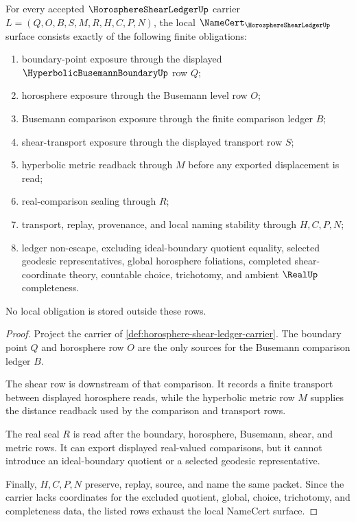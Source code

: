 \begin{theorem}
\label{thm:horosphere-shear-ledger-namecert-obligations}
For every accepted $\HorosphereShearLedgerUp$ carrier $L=(Q,O,B,S,M,R,H,C,P,N)$, the local $\NameCert_{\HorosphereShearLedgerUp}$ surface consists exactly of the following finite obligations:
\begin{enumerate}
\item boundary-point exposure through the displayed $\HyperbolicBusemannBoundaryUp$ row $Q$;
\item horosphere exposure through the Busemann level row $O$;
\item Busemann comparison exposure through the finite comparison ledger $B$;
\item shear-transport exposure through the displayed transport row $S$;
\item hyperbolic metric readback through $M$ before any exported displacement is read;
\item real-comparison sealing through $R$;
\item transport, replay, provenance, and local naming stability through $H,C,P,N$;
\item ledger non-escape, excluding ideal-boundary quotient equality, selected geodesic representatives, global horosphere foliations, completed shear-coordinate theory, countable choice, trichotomy, and ambient $\RealUp$ completeness.
\end{enumerate}
No local obligation is stored outside these rows.
\end{theorem}
\begin{proof}
Project the carrier of \autoref{def:horosphere-shear-ledger-carrier}. The boundary point $Q$ and horosphere row $O$ are the only sources for the Busemann comparison ledger $B$.

The shear row is downstream of that comparison. It records a finite transport between displayed horosphere reads, while the hyperbolic metric row $M$ supplies the distance readback used by the comparison and transport rows.

The real seal $R$ is read after the boundary, horosphere, Busemann, shear, and metric rows. It can export displayed real-valued comparisons, but it cannot introduce an ideal-boundary quotient or a selected geodesic representative.

Finally, $H,C,P,N$ preserve, replay, source, and name the same packet. Since the carrier lacks coordinates for the excluded quotient, global, choice, trichotomy, and completeness data, the listed rows exhaust the local NameCert surface.
\end{proof}

